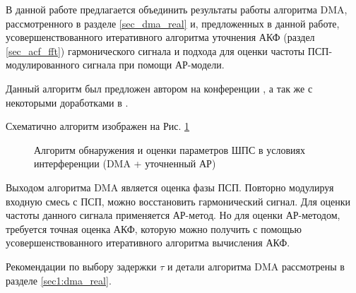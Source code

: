 В данной работе предлагается объединить результаты работы алгоритма DMA, рассмотренного в разделе
\ref{sec_dma_real} и, предложенных в данной работе, усовершенствованного итеративного 
алгоритма уточнения АКФ (раздел \ref{sec_acf_fft}) гармонического сигнала и 
подхода для оценки частоты ПСП-модулированного сигнала при помощи АР-модели.

Данный алгоритм был предложен автором на конференции \cite{my_dma_ar}, а так же с некоторыми доработками в \cite{my_otchet}.

Схематично алгоритм изображен на Рис. \ref{pic4:dma_quadruple_lpc}

\begin{figure}[h]
\center{}
	\caption{Алгоритм обнаружения и оценки параметров ШПС в условиях интерференции (DMA + уточненный АР)}
	\label{pic4:dma_quadruple_lpc}
\end{figure}

Выходом алгоритма DMA является оценка фазы ПСП. Повторно модулируя входную смесь с ПСП, можно восстановить гармонический сигнал. Для оценки частоты данного сигнала применяется
АР-метод. Но для оценки АР-методом, требуется точная оценка АКФ, которую можно получить
с помощью усовершенствованного итеративного алгоритма вычисления АКФ.

Рекомендации по выбору задержки ${\tau}$ и детали алгоритма DMA рассмотрены в разделе
\ref{sec1:dma_real}.


